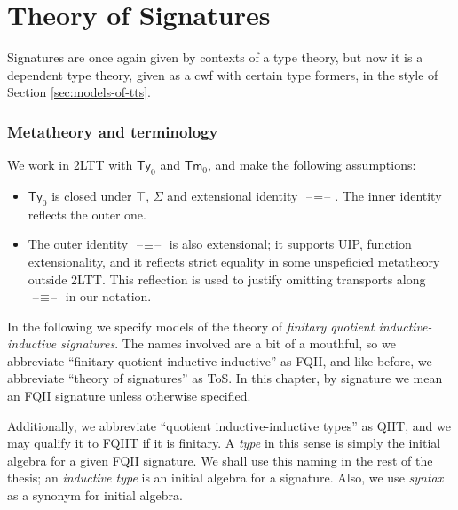 \documentclass[12pt,a4paper,twoside,openany]{book}
\theoremstyle{remark}
\theoremstyle{definition}
\theoremstyle{theorem}
\newcommand{\Tm}{\mathsf{Tm}}
\newcommand{\Ty}{\mathsf{Ty}}
\newcommand{\blank}{\mathord{\hspace{1pt}\text{--}\hspace{1pt}}}
\begin{document}
\section{Theory of Signatures}
\label{sec:fqiit-tos}

Signatures are once again given by contexts of a type theory, but now it is a
dependent type theory, given as a cwf with certain type formers, in the style
of Section \ref{sec:models-of-tts}.

\subsubsection{Metatheory and terminology}
We work in 2LTT with $\Ty_0$ and $\Tm_0$, and make the following assumptions:
\begin{itemize}
  \item $\Ty_0$ is closed under $\top$, $\Sigma$ and extensional identity $\blank\!=\!\blank$.
        The inner identity reflects the outer one.
  \item The outer identity $\blank\!\equiv\!\blank$ is also extensional; it supports
        UIP, function extensionality, and it reflects strict equality in some
        unspeficied metatheory outside 2LTT. This reflection is used to justify
        omitting transports along $\blank\!\equiv\!\blank$ in our notation.
\end{itemize}

In the following we specify models of the theory of \emph{finitary quotient
inductive-inductive signatures}. The names involved are a bit of a mouthful, so
we abbreviate ``finitary quotient inductive-inductive'' as FQII, and like
before, we abbreviate ``theory of signatures'' as ToS. In this chapter, by
signature we mean an FQII signature unless otherwise specified.

Additionally, we abbreviate ``quotient inductive-inductive types'' as QIIT, and
we may qualify it to FQIIT if it is finitary. A \emph{type} in this sense is
simply the initial algebra for a given FQII signature. We shall use this naming
in the rest of the thesis; an \emph{inductive type} is an initial algebra for a
signature. Also, we use \emph{syntax} as a synonym for initial algebra.
\end{document}
